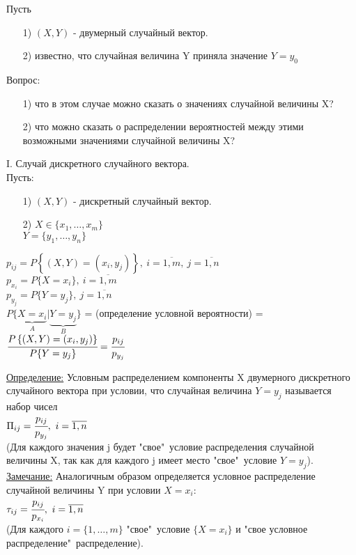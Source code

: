 
Пусть 
\begin{enumerate}
\item[1)] $(X,Y)$ - двумерный случайный вектор.
\item[2)] известно, что случайная величина Y приняла значение $Y = y_0$
\end{enumerate}
Вопрос: \\
\begin{enumerate}
\item[1)] что в этом случае можно сказать о значениях случайной величины X?
\item[2)] что можно сказать о распределении вероятностей между этими возможными значениями случайной величины X?
\end{enumerate}


I. Случай дискретного случайного вектора. \\
Пусть: \\
\begin{enumerate}
\item[1)] $(X,Y)$ - дискретный случайный вектор. 
\item[2)] $X \in \{x_1, \ldots, x_m\}$ \\
$Y = \{y_1, \ldots, y_n\}$ \\
\end{enumerate}
$p_{ij} = P \left\{ (X,Y) = (x_i,y_j) \right\}, \ i = \overline{1,m}, \ j = \overline{1,n}$ \\
$p_{x_i} = P\{X = x_i\}, \ i = \overline{1,m}$ \\
$p_{y_j} = P\{Y = y_j\}, \ j = \overline{1,n}$ \\
$P\{ \underbrace{X = x_i}_{A} | \underbrace{Y = y_j}_{B} \}$ = (определение условной вероятности) = $ \cfrac{P \left\{ (X,Y) = (x_i,y_j) \right\}}{P\{Y = y_j\}} = \cfrac{p_{ij}}{p_{y_j}}$


\underline{Определение:} Условным распределением компоненты X двумерного дискретного случайного вектора при условии, что случайная величина $Y = y_j$ называется набор чисел \\
$\Pi_{ij} = \cfrac{p_{ij}}{p_{y_j}}, \ i = \overline{1,n}$ \\
(Для каждого значения j будет "свое"\ условие распределения случайной величины X, так как для каждого j имеет место "свое"\ условие $Y = y_j$). \\


\underline{Замечание:} Аналогичным образом определяется условное распределение случайной величины Y при условии $X = x_i$: \\
$\tau_{ij} = \cfrac{p_{ij}}{p_{x_i}}, \ i = \overline{1,n}$ \\
(Для каждого $i = \{1, \ldots, m\}$ "свое"\ условие $\{X = x_i\}$ и "свое условное распределение"\ распределение).


